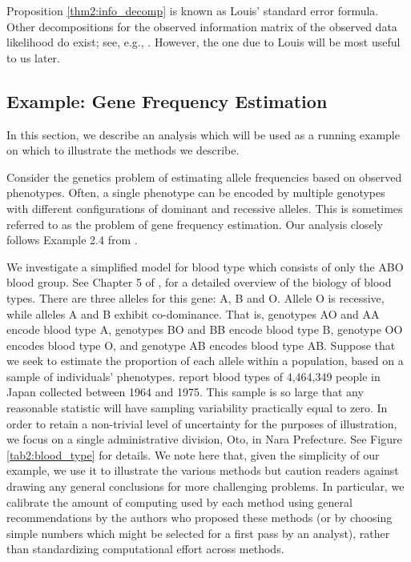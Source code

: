 \documentclass[ss]{imsart}
\theoremstyle{plain}
\theoremstyle{definition}
\theoremstyle{remark}
\begin{document}
Proposition \ref{thm2:info_decomp} is known as Louis' standard error formula. Other decompositions for the observed information matrix of the observed data likelihood do exist; see, e.g., \citet{Oak99,McL08}. However, the one due to Louis will be most useful to us later.

\subsection{Example: Gene Frequency Estimation}
\label{sec:eg-genes}

In this section, we describe an analysis which will be used as a running example on which to illustrate the methods we describe. 

Consider the genetics problem of estimating allele frequencies based on observed phenotypes. Often, a single phenotype can be encoded by multiple genotypes with different configurations of dominant and recessive alleles. This is sometimes referred to as the problem of gene frequency estimation. Our analysis closely follows Example 2.4 from \citet{McL08}.%

We investigate a simplified model for blood type which consists of only the ABO blood group. See Chapter 5 of \citet{Dea05}, for a detailed overview of the biology of blood types. There are three alleles for this gene: A, B and O. Allele O is recessive, while alleles A and B exhibit co-dominance. That is, genotypes AO and AA encode blood type A, genotypes BO and BB encode blood type B, genotype OO encodes blood type O, and genotype AB encodes blood type AB. Suppose that we seek to estimate the proportion of each allele within a population, based on a sample of individuals' phenotypes. \citet{Fuj78} report blood types of 4,464,349 people in Japan collected between 1964 and 1975. This sample is so large that any reasonable statistic will have sampling variability practically equal to zero. In order to retain a non-trivial level of uncertainty for the purposes of illustration, we focus on a single administrative division, Oto, in Nara Prefecture. See Figure \ref{tab2:blood_type} for details. We note here that, given the simplicity of our example, we use it to illustrate the various methods but caution readers against drawing any general conclusions for more challenging problems. In particular, we calibrate the amount of computing used by each method using general recommendations by the authors who proposed these methods (or by choosing simple numbers which might be selected for a first pass by an analyst), rather than standardizing computational effort across methods.
\end{document}

